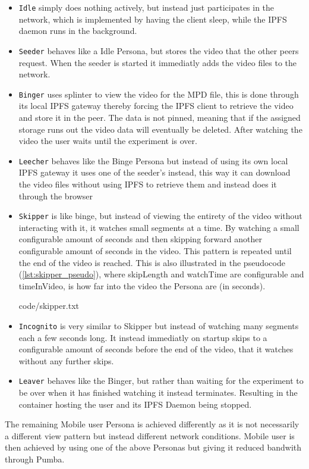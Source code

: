 \begin{itemize}
    \item \texttt{Idle} simply does nothing actively, but instead just participates in the network, which is implemented by having the client sleep, while the \ac{IPFS} daemon runs in the background.
    \item \texttt{Seeder} behaves like a Idle Persona, but stores the video that the other peers request. When the seeder is started it immediatly adds the video files to the network.
    \item \texttt{Binger} uses splinter to view the video for the \ac{MPD} file, this is done through its local \ac{IPFS} gateway thereby forcing the \ac{IPFS} client to retrieve the video and store it in the peer. The data is not pinned, meaning that if the assigned storage runs out the video data will eventually be deleted. After watching the video the user waits until the experiment is over.
    \item \texttt{Leecher} behaves like the Binge Persona but instead of using its own local \ac{IPFS} gateway it uses one of the seeder's instead, this way it can download the video files without using \ac{IPFS} to retrieve them and instead does it through the browser
    \item \texttt{Skipper} is like binge, but instead of viewing the entirety of the video without interacting with it, it watches small segments at a time. By watching a small configurable amount of seconds and then skipping forward another configurable amount of seconds  in the video. This pattern is repeated until the end of the video is reached. This is also illustrated in the pseudocode (\autoref{lst:skipper_pseudo}), where skipLength and watchTime are configurable and timeInVideo, is how far into the video the Persona are (in seconds).
    
    {code/skipper.txt}
    \item \texttt{Incognito} is very similar to Skipper but instead of watching many segments each a few seconds long. It instead immediatly on startup skips to a configurable amount of seconds before the end of the video, that it watches without any further skips.
    \item \texttt{Leaver} behaves like the Binger, but rather than waiting for the experiment to be over when it has finished watching it instead terminates. Resulting in the container hosting the user and its \ac{IPFS} Daemon being stopped.
\end{itemize}
The remaining Mobile user Persona is achieved differently as it is not necessarily a different view pattern but instead different network conditions. Mobile user is then achieved by using one of the above Personas but giving it reduced bandwith through Pumba.

